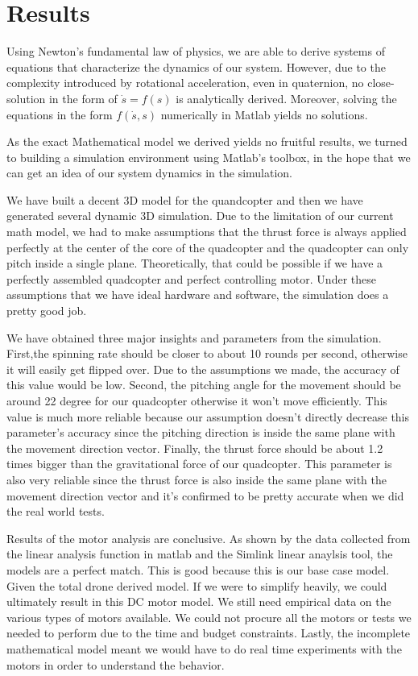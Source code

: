 \section{Results}
Using Newton's fundamental law of physics, we are able to derive systems of equations that characterize the dynamics of our system. However, due to the complexity introduced by rotational acceleration, even in quaternion, no close-solution in the form of $\dot{s} = f(s)$ is analytically derived. Moreover, solving the equations in the form $f(\dot{s},s)$ numerically in Matlab yields no solutions. \par
As the exact Mathematical model we derived yields no fruitful results, we turned to building a simulation environment using Matlab's toolbox, in the hope that we can get an idea of our system dynamics in the simulation. \par
We have built a decent 3D model for the quandcopter and then we have generated several dynamic 3D simulation. Due to the limitation of our current math model, we had to make assumptions that the thrust force is always applied perfectly at the center of the core of the quadcopter and the quadcopter can only pitch inside a single plane. Theoretically, that could be possible if we have a perfectly assembled quadcopter and perfect controlling motor. Under these assumptions that we have ideal hardware and software, the simulation does a pretty good job.\par
We have obtained three major insights and parameters from the simulation. First,the spinning rate should be closer to about 10 rounds per second, otherwise it will easily get flipped over. Due to the assumptions we made, the accuracy of this value would be low. Second, the pitching angle for the movement should be around 22 degree for our quadcopter otherwise it won't move efficiently. This value is much more reliable because our assumption doesn't directly decrease this parameter's accuracy since the pitching direction is inside the same plane with the movement direction vector. Finally, the thrust force should be about 1.2 times bigger than the gravitational force of our quadcopter. This parameter is also very reliable since the thrust force is also inside the same plane with the movement direction vector and it's confirmed to be pretty accurate when we did the real world tests.\par
Results of the motor analysis are conclusive. As shown by the data collected from the linear analysis function in matlab and the Simlink linear anaylsis tool, the models are a perfect match. This is good because this is our base case model. Given the total drone derived model. If we were to simplify heavily, we could ultimately result in this DC motor model. We still need empirical data on the various types of motors available. We could not procure all the motors or tests we needed to perform due to the time and budget constraints. Lastly, the incomplete mathematical model meant we would have to do real time experiments with the motors in order to understand the behavior.
